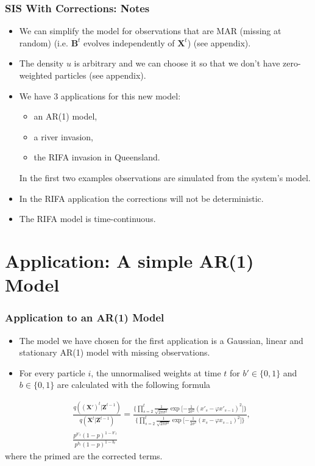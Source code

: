 \documentclass[9pt, xcolor={dvipsnames,svgnames,table}]{beamer}
\begin{document}
\begin{frame}
    \frametitle{SIS With Corrections: Notes}
    \begin{itemize}
        \item We can simplify the model for observations that are \textcolor{PineGreen}{MAR (missing at random)} (i.e. $\bm{B}^t$ evolves independently of $\bm{X}^t$) (see appendix).
        \item \textcolor{PineGreen}{The density $u$ is arbitrary} and we can choose it so that we don't have zero-weighted particles (see appendix).
        \item We have 3 applications for this new model: 
        \begin{itemize}
            \item an \textcolor{PineGreen}{AR(1) model},
            \item a \textcolor{PineGreen}{river invasion},
            \item the \textcolor{PineGreen}{RIFA invasion} in Queensland.
        \end{itemize}
        In the first two examples observations are simulated from the system's model.
        \item In the RIFA application the \textcolor{PineGreen}{corrections will not be deterministic}.
        \item The RIFA model is \textcolor{PineGreen}{time-continuous}.
    \end{itemize}
\end{frame}




\section{Application: A simple AR(1) Model}

\begin{frame}
    \frametitle{Application to an AR(1) Model}
    \begin{itemize}
    \setlength\itemsep{2em}
        \item The model we have chosen for the first application is a Gaussian, linear and stationary AR(1) model with missing observations.
        \item For every particle $i$, the unnormalised weights at time $t$ for $b' \in \{0,1\}$ and $b \in \{0,1\}$ are calculated with the following formula
        \end{itemize}
    \begin{align*} \label{eq:2}
        &\frac{q(\bm{(X')}^{t} | \bm{Z}^{t-1}) }{q(\bm{X}^{t} | \bm{Z}^{t-1})} =
        \frac{\bigg \{ \prod_{s=2}^{t}  \frac{1}{\sqrt{2 \pi \sigma^{2}}} \exp \bigg [ { - \frac{1}{2 \sigma^{2}} }  (x'_s - \varphi x'_{s-1})^{2} \bigg ] \bigg \} }{\bigg \{ \prod_{s=2}^{t}  \frac{1}{\sqrt{2 \pi \sigma^{2}}} \exp \bigg [ { - \frac{1}{2 \sigma^{2}} }  (x_s - \varphi x_{s-1})^{2} \bigg ] \bigg \} } \nonumber, \\
        &\frac{p^{b'_t} (1 - p)^{1-b'_t}  }{ p^{b_t} (1 - p)^{1-b_t} }
    \end{align*}
    where the primed are the corrected terms.
\end{frame}
\end{document}
